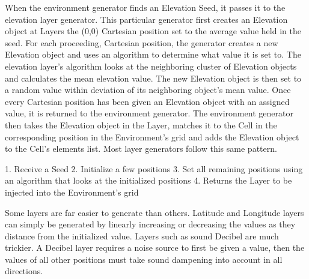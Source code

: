 \documentclass[]{report}
\begin{document}
When the environment generator finds an Elevation Seed, it passes it to the elevation layer generator.
This particular generator first creates an Elevation object at Layers the (0,0) Cartesian position set to the average value held in the seed.
For each proceeding, Cartesian position, the generator creates a new Elevation object and uses an algorithm to determine what value it is set to.
The elevation layer’s algorithm looks at the neighboring cluster of Elevation objects and calculates the mean elevation value.
The new Elevation object is then set to a random value within deviation of its neighboring object’s mean value.
Once every Cartesian position has been given an Elevation object with an assigned value, it is returned to the environment generator.
The environment generator then takes the Elevation object in the Layer, matches it to the Cell in the corresponding position in the Environment’s grid and adds the Elevation object to the Cell’s elements list.
Most layer generators follow this same pattern.

1.	Receive a Seed
2.	Initialize a few positions
3.	Set all remaining positions using an algorithm that looks at the initialized positions
4.	Returns the Layer to be injected into the Environment’s grid

Some layers are far easier to generate than others.
Latitude and Longitude layers can simply be generated by linearly increasing or decreasing the values as they distance from the initialized value.
Layers such as sound Decibel are much trickier.
A Decibel layer requires a noise source to first be given a value, then the values of all other positions must take sound dampening into account in all directions.
\end{document}
